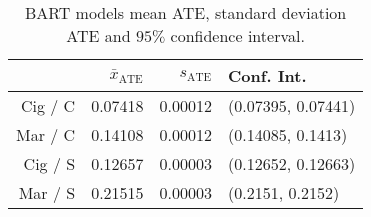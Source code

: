 \begin{table}[ht]
\centering
\begin{tabular}{rrrl}
  \hline
 & $\bar{x}_{\text{ATE}}$ & $s_{\text{ATE}}$ & Conf. Int. \\ 
  \hline
Cig / C & 0.07418 & 0.00012 & (0.07395, 0.07441) \\ 
  Mar / C & 0.14108 & 0.00012 & (0.14085, 0.1413) \\ 
  Cig / S & 0.12657 & 0.00003 & (0.12652, 0.12663) \\ 
  Mar / S & 0.21515 & 0.00003 & (0.2151, 0.2152) \\ 
   \hline
\end{tabular}
\caption{BART models mean ATE, standard deviation ATE and $95\%$ confidence interval.}
\end{table}
